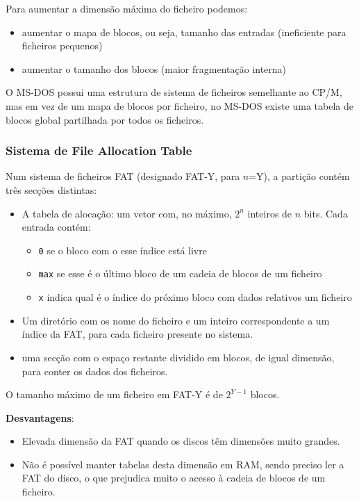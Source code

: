 \documentclass[11pt]{article}
\begin{document}
Para aumentar a dimensão máxima do ficheiro podemos:
\begin{itemize}
    \item aumentar o mapa de blocos, ou seja, tamanho das entradas (ineficiente para ficheiros pequenos)
    \item aumentar o tamanho dos blocos (maior fragmentação interna)
\end{itemize}

O MS-DOS possui uma estrutura de sistema de ficheiros semelhante ao CP/M, mas em vez de um mapa de blocos por ficheiro, no MS-DOS existe uma tabela de blocos global partilhada por todos os ficheiros.

\subsubsection{Sistema de File Allocation Table}

Num sistema de ficheiros FAT (designado FAT-Y, para $n$=Y), a partição contém três secções distintas:
\begin{itemize}
    \item A tabela de alocação: um vetor com, no máximo, $2^n$ inteiros de $n$ bits. Cada entrada contém:
          \begin{itemize}[topsep=-2pt]
              \item \lstinline|0| se o bloco com o esse índice está livre
              \item \lstinline|max| se esse é o último bloco de um cadeia de blocos de um ficheiro
              \item \lstinline|x| indica qual é o índice do próximo bloco com dados relativos um ficheiro
          \end{itemize}
    \item Um diretório com os nome do ficheiro e um inteiro correspondente a um índice da FAT, para cada ficheiro presente no sistema.
    \item uma secção com o espaço restante dividido em blocos, de igual dimensão, para conter os dados dos ficheiros.
\end{itemize}

O tamanho máximo de um ficheiro em FAT-Y é de $2^{Y-1}$ blocos.

\textbf{Desvantagens}:
\begin{itemize}
    \item Elevada dimensão da FAT quando os discos têm dimensões muito grandes.
    \item Não é possível manter tabelas desta dimensão em RAM, sendo preciso ler a FAT do disco, o que prejudica muito o acesso à cadeia de blocos de um ficheiro.
\end{itemize}
\end{document}
